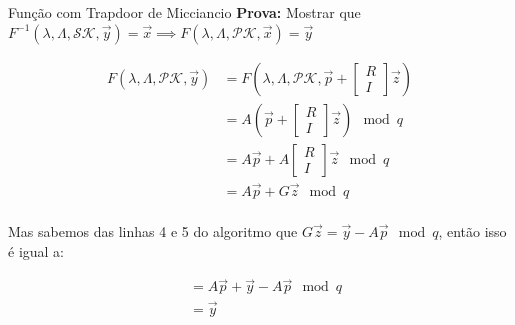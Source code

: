 \documentclass{beamer}
\begin{document}
\begin{frame}{Função com Trapdoor de Micciancio}
    \textbf{Prova:} Mostrar que $F^{-1}(\lambda,\Lambda,\mathcal{SK},\overrightarrow{y})=\overrightarrow{x}\implies F(\lambda,\Lambda,\mathcal{PK}, \overrightarrow{x})=\overrightarrow{y}$

 \begin{equation*}
 \begin{split}
 F(\lambda,\Lambda,\mathcal{PK}, \overrightarrow{y})&= 
 F(\lambda,\Lambda,\mathcal{PK}, \overrightarrow{p}
 + \begin{bmatrix}R\\I\end{bmatrix}\overrightarrow{z})\\ &=
   A(\overrightarrow{p}
   + \begin{bmatrix}R\\I\end{bmatrix}\overrightarrow{z}) \mod q\\ &=
     A\overrightarrow{p} +
     A\begin{bmatrix}R\\I\end{bmatrix}\overrightarrow{z} \mod q\\ &=
     A\overrightarrow{p} + G\overrightarrow{z} \mod q\\
 \end{split}
 \end{equation*}

Mas sabemos das linhas 4 e 5 do algoritmo que  $G\overrightarrow{z}=\overrightarrow{y} -
 A\overrightarrow{p} \mod q$, então isso é igual a:

  \begin{equation*}
 \begin{split}
&= A\overrightarrow{p} + \overrightarrow{y} - A\overrightarrow{p} \mod q\\ &=   \overrightarrow{y}\\
  \end{split}
 \end{equation*}
\end{frame}
\end{document}
